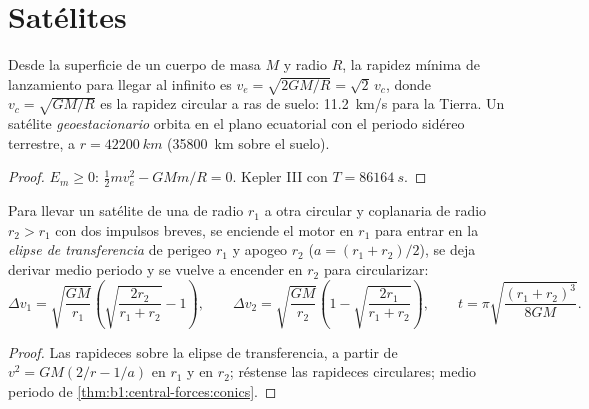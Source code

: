 \section{Satélites}

\begin{proposition}\label{prop:b1:central-forces:escape}
Desde la superficie de un cuerpo de masa $M$ y radio $R$, la rapidez
mínima de lanzamiento para llegar al infinito es
$v_e = \sqrt{2GM/R} = \sqrt2\,v_c$, donde $v_c = \sqrt{GM/R}$ es la
rapidez circular a ras de suelo: \qty{11.2}{km/s} para la Tierra. Un
satélite \emph{geoestacionario} orbita en el plano ecuatorial con el
periodo sidéreo terrestre, a $r = \qty{42200}{km}$ (\qty{35800}{km} sobre
el suelo).
\end{proposition}

\begin{proof}
$E_m \geq 0$: $\tfrac12 mv_e^2 - GMm/R = 0$. Kepler III con $T = \qty{86164}{s}$.
\end{proof}

\begin{proposition}\label{prop:b1:central-forces:hohmann}
Para llevar un satélite de una  de radio $r_1$ a otra
circular y coplanaria de radio $r_2 > r_1$ con dos impulsos breves, se
enciende el motor en $r_1$ para entrar en la \emph{elipse de
transferencia} de perigeo $r_1$ y apogeo $r_2$ ($a = (r_1 + r_2)/2$), se
deja derivar medio periodo y se vuelve a encender en $r_2$ para
circularizar:
\[
\Delta v_1 = \sqrt{\frac{GM}{r_1}}\left(\sqrt{\frac{2r_2}{r_1 + r_2}} - 1\right),
\qquad
\Delta v_2 = \sqrt{\frac{GM}{r_2}}\left(1 - \sqrt{\frac{2r_1}{r_1 + r_2}}\right),
\qquad
t = \pi\sqrt{\frac{(r_1 + r_2)^3}{8GM}} .
\]
\end{proposition}

\begin{proof}
Las rapideces sobre la elipse de transferencia, a partir de
$v^2 = GM(2/r - 1/a)$ en $r_1$ y en $r_2$; réstense las rapideces
circulares; medio periodo de \cref{thm:b1:central-forces:conics}.
\end{proof}

